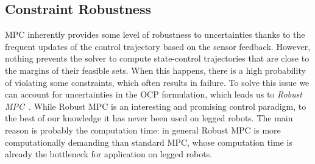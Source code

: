 \subsection{Constraint Robustness}
MPC inherently provides some level of robustness to uncertainties thanks to the frequent updates of the control trajectory based on the sensor feedback.
However, nothing prevents the solver to compute state-control trajectories that are close to the margins of their feasible sets.
When this happens, there is a high probability of violating some constraints, which often results in failure.
To solve this issue we can account for uncertainties in the OCP formulation, which leads us to \emph{Robust MPC}~\citep{Bemporad1999}.
While Robust MPC is an interesting and promising control paradigm, to the best of our knowledge it has never been used on legged robots.
The main reason is probably the computation time: in general Robust MPC is more computationally demanding than standard MPC, whose computation time is already the bottleneck for application on legged robots.

